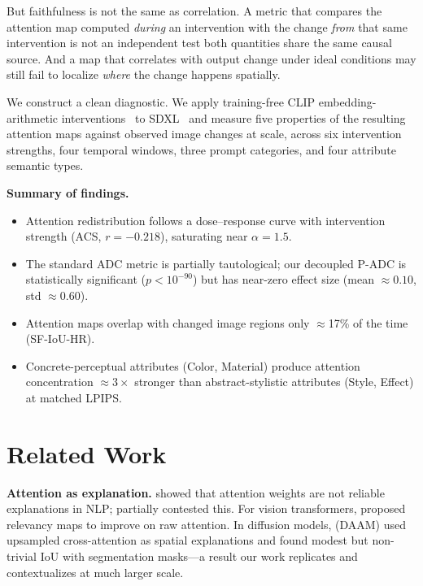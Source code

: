 \documentclass{article}
\begin{document}
But faithfulness is not the same as correlation.  A metric that
compares the attention map computed \emph{during} an intervention
with the change \emph{from} that same intervention is not an
independent test both quantities share the same causal source.
And a map that correlates with output change under ideal conditions
may still fail to localize \emph{where} the change happens spatially.

We construct a clean diagnostic.  We apply training-free CLIP
embedding-arithmetic interventions~\citep{gal2023image} to
SDXL~\citep{podell2023sdxl} and measure five properties of the
resulting attention maps against observed image changes at scale,
across six intervention strengths, four temporal windows, three
prompt categories, and four attribute semantic types.

\textbf{Summary of findings.}
\begin{itemize}[noitemsep,topsep=2pt,leftmargin=1em]
  \item Attention redistribution follows a dose--response curve with
        intervention strength (ACS, $r=-0.218$), saturating near
        $\alpha=1.5$.
  \item The standard ADC metric is partially tautological; our
        decoupled P-ADC is statistically significant
        ($p < 10^{-90}$) but has near-zero effect size
        (mean $\approx 0.10$, std $\approx 0.60$).
  \item Attention maps overlap with changed image regions only
        $\approx$17\% of the time (SF-IoU-HR).
  \item Concrete-perceptual attributes (Color, Material) produce
        attention concentration ${\approx}3\times$ stronger than
        abstract-stylistic attributes (Style, Effect) at matched LPIPS.
\end{itemize}

\section{Related Work}
\label{sec:related}

\textbf{Attention as explanation.}
\citet{jain2019attention} showed that attention weights are
not reliable explanations in NLP; \citet{wiegreffe2019attention}
partially contested this.  For vision transformers,
\citet{chefer2021transformer} proposed relevancy maps to improve
on raw attention.  In diffusion models, \citet{tang2023daam}
(DAAM) used upsampled cross-attention as spatial explanations and
found modest but non-trivial IoU with segmentation masks---a result
our work replicates and contextualizes at much larger scale.
\end{document}
